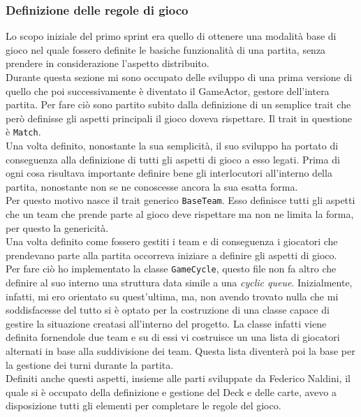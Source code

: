 	\subsubsection{Definizione delle regole di gioco}
	  Lo scopo iniziale del primo sprint era quello di ottenere una modalità base di gioco nel quale fossero definite le basiche funzionalità di una partita, senza prendere in considerazione l'aspetto distribuito.
	  \\
	  Durante questa sezione mi sono occupato delle sviluppo di una prima versione di quello che poi successivamente è diventato il GameActor, gestore dell'intera partita. 
	  Per fare ciò sono partito subito dalla definizione di un semplice trait che però definisse gli aspetti principali il gioco doveva rispettare. 
	  Il trait in questione è \texttt{Match}.\\
	  Una volta definito, nonostante la sua semplicità, il suo sviluppo ha portato di conseguenza alla definizione di tutti gli aspetti di gioco a esso legati. 
	  Prima di ogni cosa risultava importante definire bene gli interlocutori all'interno della partita, nonostante non se ne conoscesse ancora la sua esatta forma. \\
	  Per questo motivo nasce il trait generico \texttt{BaseTeam}. Esso definisce tutti gli aspetti che un team che prende parte al gioco deve rispettare ma non ne limita la forma, per questo la genericità. \\
	  Una volta definito come fossero gestiti i team e di conseguenza i giocatori che prendevano parte alla partita occorreva iniziare a definire gli aspetti di gioco.\\
	  Per fare ciò ho implementato la classe \texttt{GameCycle}, questo file non fa altro che definire al suo interno una struttura data simile a una \textit{cyclic queue}. Inizialmente, infatti, mi ero orientato su quest'ultima, ma, non avendo trovato nulla che mi soddisfacesse del tutto si è optato per la costruzione di una classe capace di gestire la situazione creatasi all'interno del progetto. 
	  La classe infatti viene definita fornendole due team e su di essi vi costruisce un una lista di giocatori alternati in base alla suddivisione dei team. Questa lista diventerà poi la base per la gestione dei turni durante la partita. 
	  \\
	  Definiti anche questi aspetti, insieme alle parti sviluppate da Federico Naldini, il quale si è occupato della definizione e gestione del Deck e delle carte, avevo a disposizione tutti gli elementi per completare le regole del gioco. 
